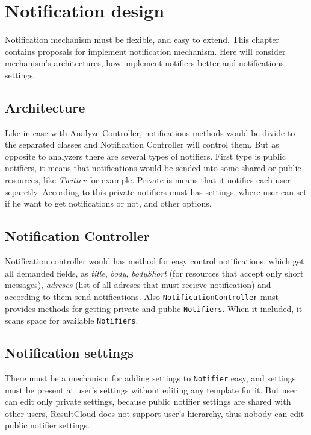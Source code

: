 \chapter{Notification design}
\label{ch:notification_proposal}

Notification mechanism must be flexible, and easy to extend. This chapter contains proposals for implement notification mechanism. Here will consider mechanism's architectures, how implement notifiers better and notifications settings. 

\section{Architecture}

Like in case with Analyze Controller, notifications methods would be divide  to the separated classes and Notification Controller will control them. But as opposite to analyzers there are several types of notifiers. First type is public notifiers, it means that notifications would be sended into some shared or public resources, like \emph{Twitter} for example. Private is means that it notifies each user separetly. According to this private notifiers must has settings, where user can set if he want to get notifications or not, and other options.

\section{Notification Controller}

Notification controller would has method for easy control notifications, which get all demanded fields, as \emph{title}, \emph{body}, \emph{bodyShort} (for resources that accept only short messages), \emph{adreses} (list of all adreses that must recieve notification) and according to them send notifications. Also \texttt{NotificationController} must provides methods for getting private and public \texttt{Notifiers}. When it included, it scans space for available \texttt{Notifiers}.

\section{Notification settings}

There must be a mechanism for adding settings to \texttt{Notifier} easy, and settings must be present at user's settings without editing any template for it. But user can edit only private settings, because public notifier settings are shared with other users, ResultCloud does not support user's hierarchy, thus nobody can edit public notifier settings.

